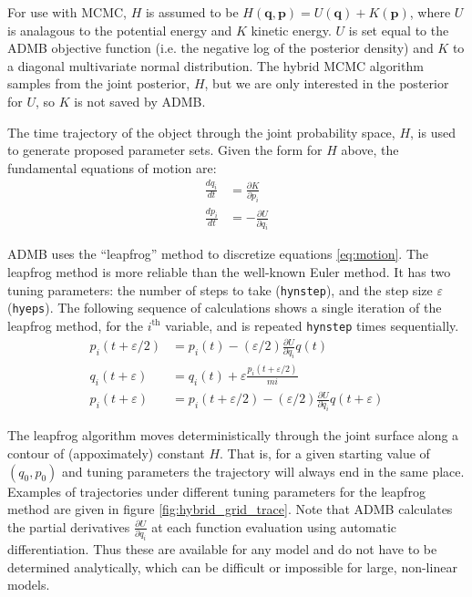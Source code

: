 \documentclass{article}\usepackage[]{graphicx}\usepackage[]{color}
\begin{document}
For use with MCMC, $H$ is assumed to be
$H(\mathbf{q},\mathbf{p})=U(\mathbf{q})+K(\mathbf{p})$,
where $U$ is analagous to the potential energy and $K$
kinetic energy. $U$ is set equal to the ADMB objective
function (i.e. the negative log of the posterior density)
and $K$ to a diagonal multivariate normal distribution. The
hybrid MCMC algorithm samples from the joint posterior, $H$,
but we are only interested in the posterior for $U$, so $K$
is not saved by ADMB.

The time trajectory of the object through the joint
probability space, $H$, is used to generate proposed
parameter sets. Given the form for $H$ above, the
fundamental equations of motion are:
\begin{align}
  \label{eq:motion}
  \frac{dq_i}{dt} &= \frac{\partial{K}}{\partial{p_i}}\\
  \frac{dp_i}{dt} &= -\frac{\partial{U}}{\partial{q_i}}
\end{align}

ADMB uses the ``leapfrog'' method to discretize equations
\eqref{eq:motion}. The leapfrog method is more reliable than
the well-known Euler method. It has two tuning parameters:
the number of steps to take (\texttt{hynstep}), and the step
size $\varepsilon$ (\texttt{hyeps}). The following sequence of
calculations shows a single iteration of the leapfrog
method, for the $i^{\text{th}}$ variable, and is repeated
\texttt{hynstep} times sequentially.
\begin{align*}
  p_i(t+\varepsilon/2)&=p_i(t)-(\varepsilon/2)\frac{\partial{U}}{\partial{q_i}}q(t)\\
  q_i(t+\varepsilon)&=q_i(t)+\varepsilon \frac{p_i(t+\varepsilon/2)}{mi}\\
  p_i(t+\varepsilon)&=p_i(t+\varepsilon/2)-(\varepsilon/2)\frac{\partial{U}}{\partial{q_i}}q(t+\varepsilon)
\end{align*}

The leapfrog algorithm moves deterministically through the
joint surface along a contour of (appoximately) constant
$H$. That is, for a given starting value of $(q_0,p_0)$ and
tuning parameters the trajectory will always end in the same
place. Examples of trajectories under different tuning
parameters for the leapfrog method are given in figure
\ref{fig:hybrid_grid_trace}. Note that ADMB calculates the
partial derivatives $\frac{\partial{U}}{\partial{q_i}}$ at
each function evaluation using automatic
differentiation. Thus these are available for any model and
do not have to be determined analytically, which can be
difficult or impossible for large, non-linear models.
\end{document}
